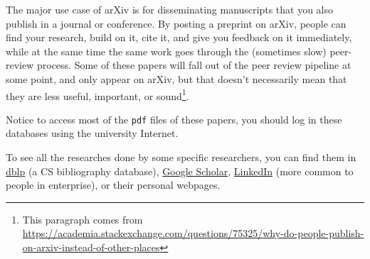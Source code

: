 \documentclass[english]{../TexTemplate/thesis}
\begin{document}
The major use case of arXiv is for disseminating manuscripts that you also publish in a journal or conference. By posting a preprint on arXiv, people can find your research, build on it, cite it, and give you feedback on it immediately, while at the same time the same work goes through the (sometimes slow) peer-review process. Some of these papers will fall out of the peer review pipeline at some point, and only appear on arXiv, but that doesn't necessarily mean that they are less useful, important, or sound\footnote{This paragraph comes from \url{https://academia.stackexchange.com/questions/75325/why-do-people-publish-on-arxiv-instead-of-other-places}}.

Notice to access most of the \verb'pdf' files of these papers, you should log in these databases using the university Internet.

To see all the researches done by some specific researchers, you can find them in \href{https://dblp.org/}{dblp} (a CS bibliography database), \href{https://scholar.google.com/}{Google Scholar}, \href{https://www.linkedin.com/}{LinkedIn} (more common to people in enterprise), or their personal webpages.
\end{document}
